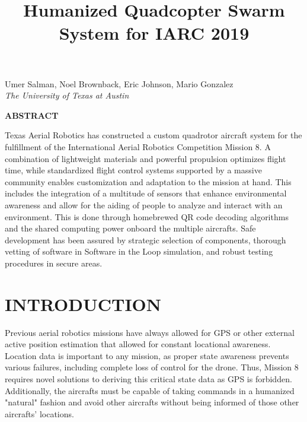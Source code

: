 \documentclass[12pt,letterpaper]{article}
\title{Humanized Quadcopter Swarm System for IARC 2019}
\newenvironment{nscenter}
 {\parskip=0pt\par\nopagebreak\centering}
 {\par\noindent\ignorespacesafterend}
\newcommand{\affiliatedauthor}[2]{
\begin{nscenter}
	#1 \\ \textit{#2}
\end{nscenter}
}
\renewcommand{\abstractname}{ABSTRACT}
\renewenvironment{abstract}
 {\vspace{-0.5ex}
	\small
	\begin{center}
		\bfseries \abstractname\vspace{-4ex}\vspace{0pt}
	\end{center}
	\list{}{
		\setlength{\leftmargin}{0.5in}
		\setlength{\rightmargin}{\leftmargin}
	}
	\item\relax}
 {\endlist}
\begin{document}
\begin{center}
	\textbf{\LARGE{\thetitle}}
\end{center}

\affiliatedauthor{Umer Salman, Noel Brownback, Eric Johnson, Mario Gonzalez}{The University of Texas at Austin}


\begin{abstract}
	Texas Aerial Robotics has constructed a custom quadrotor aircraft system for the fulfillment of the International Aerial Robotics Competition Mission 8. A combination of lightweight materials and powerful propulsion optimizes flight time, while standardized flight control systems supported by a massive community enables customization and adaptation to the mission at hand. This includes the integration of a multitude of sensors that enhance environmental awareness and allow for the aiding of people to analyze and interact with an environment. This is done through homebrewed QR code decoding algorithms and the shared computing power onboard the multiple aircrafts. Safe development has been assured by strategic selection of components, thorough vetting of software in Software in the Loop simulation, and robust testing procedures in secure areas.
\end{abstract}


\section*{INTRODUCTION}
	Previous aerial robotics missions have always allowed for GPS or other external active position estimation  that allowed for constant locational awareness. Location data is important to any mission, as proper state awareness prevents various failures, including complete loss of control for the drone. Thus, Mission 8 requires novel solutions to deriving this critical state data as GPS is forbidden. Additionally, the aircrafts must be capable of taking commands in a humanized "natural" fashion and avoid other aircrafts without being informed of those other aircrafts' locations.
\end{document}
